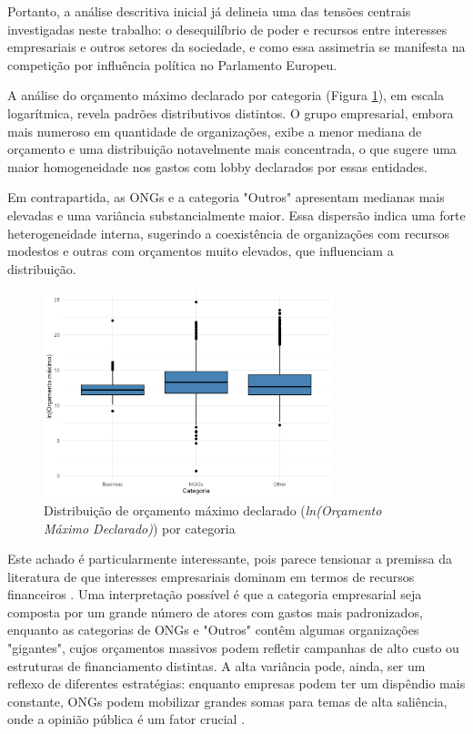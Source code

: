 Portanto, a análise descritiva inicial já delineia uma das tensões centrais investigadas neste trabalho: o desequilíbrio de poder e recursos entre interesses empresariais e outros setores da sociedade, e como essa assimetria se manifesta na competição por influência política no Parlamento Europeu.


A análise do orçamento máximo declarado por categoria (Figura \ref{fig:budget_ln_boxplot}), em escala logarítmica, revela padrões distributivos distintos. O grupo empresarial, embora mais numeroso em quantidade de organizações, exibe a menor mediana de orçamento e uma distribuição notavelmente mais concentrada, o que sugere uma maior homogeneidade nos gastos com lobby declarados por essas entidades.

Em contrapartida, as ONGs e a categoria "Outros" apresentam medianas mais elevadas e uma variância substancialmente maior. Essa dispersão indica uma forte heterogeneidade interna, sugerindo a coexistência de organizações com recursos modestos e outras com orçamentos muito elevados, que influenciam a distribuição.

\begin{figure}[!htbp]
\centering
\includegraphics[width=0.75\textwidth]{figures/descriptives_lobbyists/boxplot_max_budget_by_category.png}
\caption{Distribuição de orçamento máximo declarado (\textit{ln(Orçamento Máximo Declarado)}) por categoria}
\label{fig:budget_ln_boxplot}
\end{figure}

Este achado é particularmente interessante, pois parece tensionar a premissa da literatura de que interesses empresariais dominam em termos de recursos financeiros \cite{de_figueiredo_advancing_2014, dur20212wholobbies}. Uma interpretação possível é que a categoria empresarial seja composta por um grande número de atores com gastos mais padronizados, enquanto as categorias de ONGs e "Outros" contêm algumas organizações "gigantes", cujos orçamentos massivos podem refletir campanhas de alto custo ou estruturas de financiamento distintas. A alta variância pode, ainda, ser um reflexo de diferentes estratégias: enquanto empresas podem ter um dispêndio mais constante, ONGs podem mobilizar grandes somas para temas de alta saliência, onde a opinião pública é um fator crucial \cite{mahoney_lobbying_2007}.

